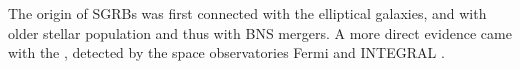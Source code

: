%
%
The origin of \acp{SGRB} was first connected with the elliptical galaxies, and with 
older stellar population 
\citep[\eg][]{Gehrels:2005qk,Fox:2005kv,Barthelmy:2005bx,Berger:2005dr,Panaitescu:2005er,Bloom:2005qx,Guetta:2005bb,Nakar:2007yr} 
and thus with \ac{BNS} mergers. A more direct evidence came with the \GRB{}
\citep{Savchenko:2017ffs,Alexander:2017aly,Troja:2017nqp,Monitor:2017mdv,Nynka:2018vup,Hajela:2019mjy}, 
detected by the space observatories Fermi \citep{TheFermi-LAT:2015kwa} and INTEGRAL \citep{Winkler:2011}.
%
%

